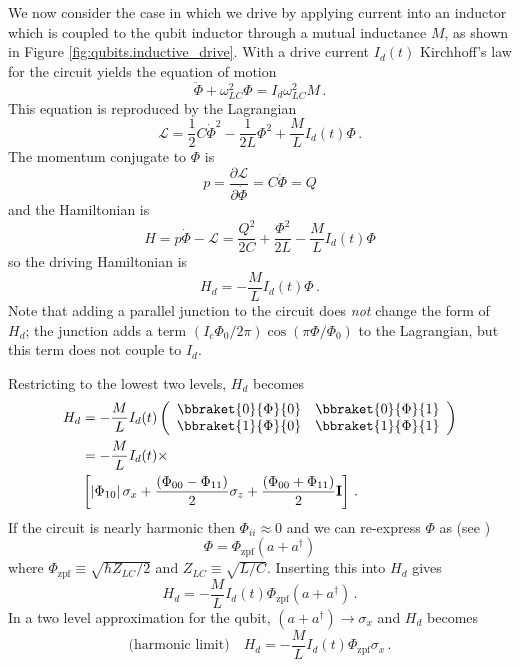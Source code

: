 We now consider the case in which we drive by applying current into an inductor which is coupled to the qubit inductor through a mutual inductance $M$, as shown in Figure \ref{fig:qubits.inductive_drive}.
With a drive current $I_d(t)$ Kirchhoff's law for the circuit yields the equation of motion
\begin{equation}
\ddot{\Phi} + \omega_{LC}^2 \Phi = I_d \omega_{LC}^2 M \, .
\end{equation}
This equation is reproduced by the Lagrangian
\begin{equation}
\mathcal{L} = \frac{1}{2}C \dot{\Phi}^2 - \frac{1}{2L} \Phi^2 + \frac{M}{L}I_d(t) \Phi \, .
\end{equation}
The momentum conjugate to $\Phi$ is
\begin{equation}
p = \frac{\partial \mathcal{L}}{\partial \dot{\Phi}} = C \dot{\Phi} = Q
\end{equation}
and the Hamiltonian is
\begin{equation}
H = p \dot{\Phi} - \mathcal{L} = \frac{Q^2}{2C} + \frac{\Phi^2}{2L} - \frac{M}{L} I_d(t) \Phi
\end{equation}
so the driving Hamiltonian is
\begin{equation}
H_d = - \frac{M}{L}I_d(t) \Phi \, .
\end{equation}
Note that adding a parallel junction to the circuit does \emph{not} change the form of $H_d$; the junction adds a term $(I_c \Phi_0 / 2\pi)\cos(\pi \Phi / \Phi_0)$ to the Lagrangian, but this term does not couple to $I_d$.

Restricting to the lowest two levels, $H_d$ becomes
\begin{align}
H_d
&= - \frac{M}{L} I_d(t) \left(
{\begin{array}{cc} \bbraket{0}{\Phi}{0} & \bbraket{0}{\Phi}{1} \\ \bbraket{1}{\Phi}{0} & \bbraket{1}{\Phi}{1} \end{array}}
\right) \\
&= - \frac{M}{L} I_d(t) \times \nonumber \\
&\left[
\left| \Phi_{10} \right| \sigma_x
+ \frac{(\Phi_{00} - \Phi_{11})}{2} \sigma_z
+ \frac{(\Phi_{00} + \Phi_{11})}{2} \mathbf{I}
\right] \, .
\end{align}
If the circuit is nearly harmonic then $\Phi_{ii} \approx 0$ and we can re-express $\Phi$ as (see \citeinternaltype {})
\begin{equation}
\Phi = \Phi_{\text{zpf}} \left( a + a^\dagger \right)
\end{equation}
where $\Phi_{\text{zpf}} \equiv \sqrt{\hbar Z_{LC} / 2}$ and $Z_{LC} \equiv \sqrt{L/C}$.
Inserting this into $H_d$ gives
\begin{equation}
H_d = -\frac{M}{L} I_d(t) \Phi_{\text{zpf}} (a + a^\dagger) \, .
\end{equation}
In a two level approximation for the qubit, $(a + a^\dagger)\rightarrow \sigma_x$ and $H_d$ becomes
\begin{equation}
\text{(harmonic limit)} \quad H_d = - \frac{M}{L} I_d(t) \Phi_{\text{zpf}} \sigma_x \, .
\end{equation}
